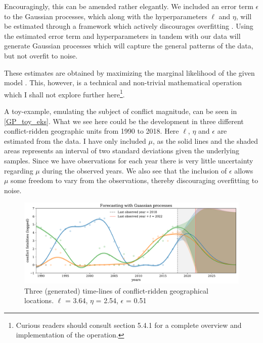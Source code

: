 \documentclass[a4paper]{article}
\begin{document}
Encouragingly, this can be amended rather elegantly. We included an error term $\epsilon$ to the Gaussian processes, which along with the hyperparameters $\ell$ and $\eta$, will be estimated through a framework which actively discourages overfitting \cite[114-115]{williams2006gaussian}. Using the estimated error term and hyperparameters in tandem with our data will generate Gaussian processes which will capture the general patterns of the data, but not overfit to noise.\par

These estimates are obtained by maximizing the marginal likelihood of the given model \cite[114-115]{williams2006gaussian}. This, however, is a technical and non-trivial mathematical operation which I shall not explore further here\footnote{Curious readers should consult \cite{williams2006gaussian} section 5.4.1 for a complete overview and implementation of the operation.}.\par

A toy-example, emulating the subject of conflict magnitude, can be seen in \autoref{GP_toy_eks}. What we see here could be the development in three different conflict-ridden geographic units from 1990 to 2018. Here $\ell$, $\eta$ and $\epsilon$ are estimated from the data. I have only included $\mu$, as the solid lines and the shaded areas represents an interval of two standard deviations given the underlying samples. Since we have observations for each year there is very little uncertainty regarding $\mu$ during the observed years. We also see that the inclusion of $\epsilon$ allows $\mu$ some freedom to vary from the observations, thereby discouraging overfitting to noise.\par

\begin{figure}[!htb]
	\centering
	\includegraphics[scale=0.47]{GP_toy_eks.pdf}
    \caption{\footnotesize{Three (generated) time-lines of conflict-ridden geographical locations. $\ell$ = 3.64, $\eta$ = 2.54, $\epsilon$ = 0.51}\label{GP_toy_eks}}
\end{figure}%
\end{document}
